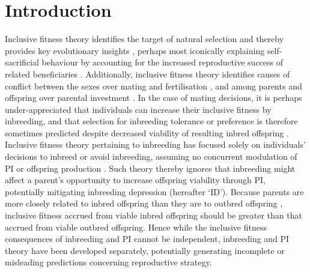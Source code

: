 \documentclass[10pt,letterpaper]{article}
\begin{document}
\section*{Introduction}
Inclusive fitness theory identifies the target of natural selection \cite[][]{Grafen2006} and thereby provides key evolutionary insights \cite[][]{Fisher2013, Bourke2014, Gardner2014, Liao2015}, perhaps most iconically explaining self-sacrificial behaviour by accounting for the increased reproductive success of related beneficiaries \cite[][]{Hamilton1964, Hamilton1964a, Frank2013}. Additionally, inclusive fitness theory identifies causes of conflict between the sexes over mating and fertilisation \cite[][]{Parker2006}, and among parents and offspring over parental investment \cite[hereafter `PI';][]{Trivers1972, Trivers1974, Kolliker2015}. In the case of mating decisions, it is perhaps under-appreciated that individuals can increase their inclusive fitness by inbreeding, and that selection for inbreeding tolerance or preference is therefore sometimes predicted despite decreased viability of resulting inbred offspring \cite[i.e., ``inbreeding depression''][]{Parker1979, Parker2006}. Inclusive fitness theory pertaining to inbreeding has focused solely on individuals' decisions to inbreed or avoid inbreeding, assuming no concurrent modulation of PI or offspring production \cite[][]{Parker2006, Kokko2006, Duthie2015a}. Such theory thereby ignores that inbreeding might affect a parent's opportunity to increase offspring viability through PI, potentially mitigating inbreeding depression (hereafter `ID'). Because parents are more closely related to inbred offspring than they are to outbred offspring \cite[][]{Trivers1974, Lynch1998, Reid2016}, inclusive fitness accrued from viable inbred offspring should be greater than that accrued from viable outbred offspring. Hence while the inclusive fitness consequences of inbreeding and PI cannot be independent, inbreeding and PI theory have been developed separately, potentially generating incomplete or misleading predictions concerning reproductive strategy.
\end{document}
